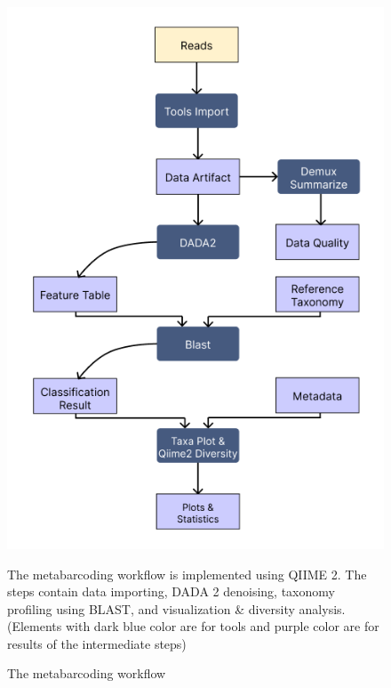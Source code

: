         \begin{figure}[H]
            \centering
            \includegraphics[scale=0.5]{images/metabarcoding_workflow.png}
            \caption{The metabarcoding workflow}
            \small The metabarcoding workflow is implemented using QIIME 2. The steps contain data importing, DADA 2 denoising, taxonomy profiling using BLAST, and visualization \& diversity analysis. (Elements with dark blue color are for tools and purple color are for results of the intermediate steps)
            \label{fig:methods:amplicon_workflow}
        \end{figure}
            
